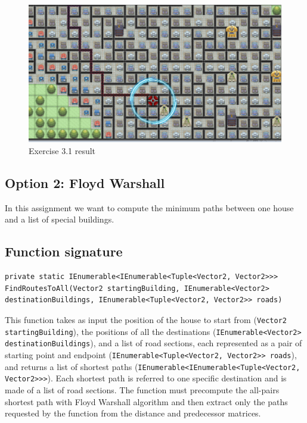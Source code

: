 \begin{figure}[!h]
\centering
\includegraphics[scale=0.2]{img/exercise3}
\caption{Exercise 3.1 result}
\label{img:Ex3-1}
\end{figure}


\subsection*{Option 2: Floyd Warshall}
In this assignment we want to compute the minimum paths between one house and a list of special buildings. 

\subsection*{Function signature} 
\begin{lstlisting}
private static IEnumerable<IEnumerable<Tuple<Vector2, Vector2>>> FindRoutesToAll(Vector2 startingBuilding, IEnumerable<Vector2> destinationBuildings, IEnumerable<Tuple<Vector2, Vector2>> roads)
\end{lstlisting}

\noindent
This function takes as input the position of the house to start from (\texttt{Vector2 startingBuilding}), the positions of all the destinations (\texttt{IEnumerable<Vector2> destinationBuildings}), and a list of road sections, each represented as a pair of starting point and endpoint (\texttt{IEnumerable<Tuple<Vector2, Vector2>> roads}), and returns a list of shortest paths (\texttt{IEnumerable<IEnumerable<Tuple<Vector2, Vector2>>>}). Each shortest path is referred to one specific destination and is made of a list of road sections.
The function must precompute the all-pairs shortest path with Floyd Warshall algorithm and then extract only the paths requested by the function from the distance and predecessor matrices.\\

